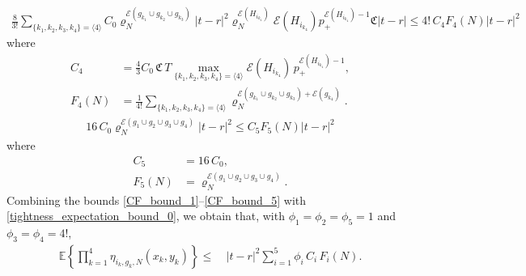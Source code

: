 \documentclass[11pt,reqno]{amsart}
\numberwithin{equation}{section}
\newcommand{\abs}[1]{\left\lvert #1 \right\rvert}
\newcommand{\sprod}[1]{\langle#1\rangle}
\newcommand{\E}[1]{\mathbb{E}\left\{ #1\right\}}
\begin{document}
{\begin{align}
    \frac{8}{3!}\sum_{\{k_1,k_2,k_3,k_4\} = \sprod{4}} C_0\varrho_N^{\mathcal{E}(g_{k_1}\cup g_{k_2}\cup g_{k_3})}\abs{t-r}^2\varrho_N^{\mathcal{E}({H}_{i_{k_4}})}\mathcal{E}({H}_{i_{k_4}})p_+^{\mathcal{E}({H}_{i_{k_4}})-1}{\mathfrak{C}}\abs{t-r}\leqslant 4!\,C_4F_4(N)\abs{t-r}^2\label{CF_bound_4}
\end{align}
where
\begin{align*}
     C_4 &= \frac{4}{3}C_0\,{\mathfrak{C}}\,T\max_{\{k_1,k_2,k_3,k_4\} = \sprod{4}} \mathcal{E}({H}_{i_{k_4}})\,p_+^{\mathcal{E}({H}_{i_{k_4}})-1} ,\\
     F_4(N) &=\frac{1}{4!}\sum_{\{k_1,k_2,k_3,k_4\}=\sprod{4}}\varrho_N^{\mathcal{E}(g_{k_1}\cup g_{k_2}\cup g_{k_3}) + \mathcal{E}(g_{k_4})}.
\end{align*}
\begin{align}
    16\,C_0\varrho_N^{\mathcal{E}(g_{1}\cup g_{2}\cup g_{3}\cup g_{4})}\abs{t-r}^2\leqslant C_5F_5(N)\abs{t-r}^2\label{CF_bound_5}
\end{align}
where
\begin{align*}
    C_5 &=16\,C_0,\\
     F_5(N) &= \varrho_N^{\mathcal{E}(g_1\cup g_2\cup g_3\cup g_4)}.
\end{align*}
Combining the bounds \eqref{CF_bound_1}--\eqref{CF_bound_5} with \eqref{tightness_expectation_bound_0}, we obtain that, with $\phi_1=\phi_2=\phi_5=1$ and $\phi_3=\phi_4=4!$,
\begin{align}
    \E{\prod_{k=1}^{4}\eta_{i_k,g_k,N}(x_k,y_k)}\leqslant&\: \abs{t-r}^2 \sum_{i=1}^5\phi_i \,C_i\,F_i(N).\label{tightness_expectation_bound}
\end{align}}
\end{document}
